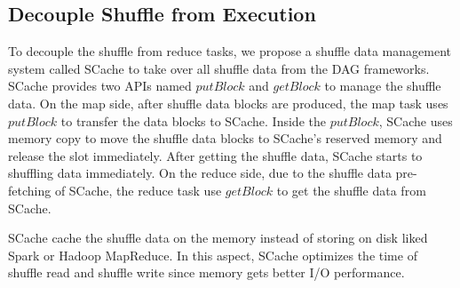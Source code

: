 \subsection{Decouple Shuffle from Execution}
{\color{black}
To decouple the shuffle from reduce tasks, we propose a shuffle data management system called SCache to take over all shuffle data from the DAG frameworks.
SCache provides two APIs named $putBlock$ and $getBlock$ to manage the shuffle data.
On the map side, after shuffle data blocks are produced, the map task uses $putBlock$ to transfer the data blocks to SCache.
Inside the $putBlock$, SCache uses memory copy to move the shuffle data blocks to SCache's reserved memory and release the slot immediately.
After getting the shuffle data, SCache starts to shuffling data immediately.
On the reduce side, due to the shuffle data pre-fetching of SCache, the reduce task use $getBlock$ to get the shuffle data from SCache.

SCache cache the shuffle data on the memory instead of storing on disk liked Spark or Hadoop MapReduce.
In this aspect, SCache optimizes the time of shuffle read and shuffle write since memory gets better I/O performance.
}



